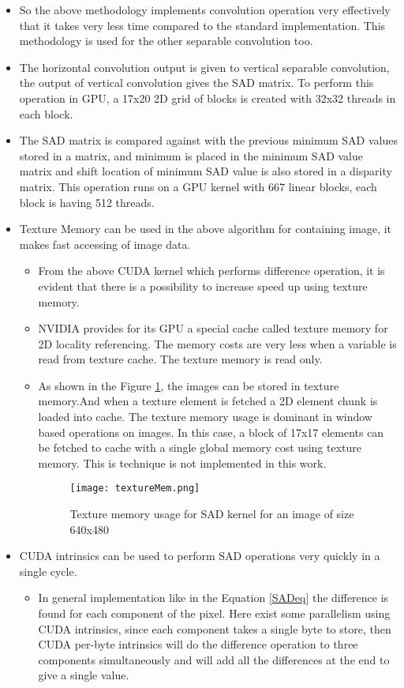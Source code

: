 \begin{itemize}
	\item So the above methodology implements convolution operation very effectively that it takes very less time compared to the standard implementation. This methodology is used for the other separable convolution too.
	\item The horizontal convolution output is given to vertical separable convolution, the output of vertical convolution gives the SAD matrix. To perform this operation in GPU, a 17x20 2D grid of blocks is created with 32x32 threads in each block.
	\item The SAD matrix is compared against with the previous minimum SAD values stored in a matrix, and minimum is placed in the minimum SAD value matrix and shift location of minimum SAD value is also stored in a disparity matrix. This operation runs on a GPU kernel with 667 linear blocks, each block is having 512 threads.
	\item Texture Memory can be used in the above algorithm for containing image, it makes fast accessing of image data. \hfill \break
	\begin{itemize}
		\item From the above CUDA kernel which performs difference operation, it is evident that there is a possibility to increase speed up using texture memory.
		\item NVIDIA provides for its GPU a special cache called texture memory for 2D locality referencing. The memory costs are very less when a variable is read from texture cache. The texture memory is read only.
		\item  As shown in the Figure \ref{fig:Texture}, the images can be stored in texture memory.And when a texture element is fetched a 2D element chunk is loaded into cache. The texture memory usage is dominant in window based operations on images. In this case, a block of 17x17 elements can be fetched to cache with a single global memory cost using texture memory. This is technique is not implemented in this work.
			\begin{figure}[h!]
				\centering
				\texttt{[image: textureMem.png]}
				\caption{Texture memory usage for SAD kernel for an image of size 640x480}
				\label{fig:Texture}
			\end{figure}
	\end{itemize}
	\item CUDA intrinsics can be used to perform SAD operations very quickly in a single cycle.
	\begin{itemize}
		\item In general implementation like in the Equation \ref{SADeq} the difference is found for each component of the pixel. Here exist some parallelism using CUDA intrinsics, since each component takes a single byte to store, then CUDA per-byte intrinsics will do the difference operation to three components simultaneously and will add all the differences at the end to give a single value.

\end{itemize}
\end{itemize}
